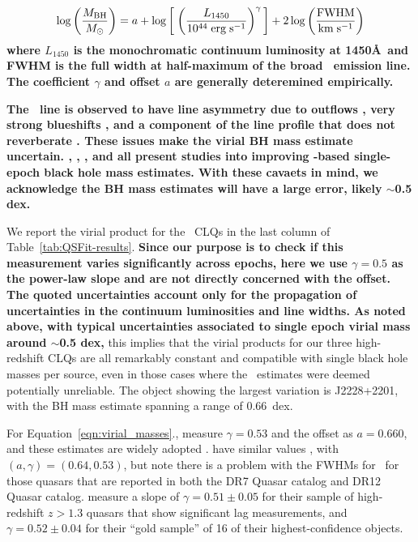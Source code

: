 \documentclass[fleqn,usenatbib]{mnras}
\begin{document}
{\bf
\begin{equation}
  \log \left( \frac{M_{\rm BH}}{M_{\odot}} \right)  = a + \log  \left[ \; \left(  \frac{L_{1450}} {10^{44} \; {\rm erg \; s^{-1}}}\right)^{\gamma} \, \right] + 2 \log \left( \frac{\rm {FWHM}}{{\rm km\; s^{-1}}} \right)
  \label{eqn:virial_masses}
\end{equation}
where $L_{1450}$ is the monochromatic continuum luminosity at 1450\AA\,
and FWHM is the full width at half-maximum of the broad \civ\ emission line.
The coefficient $\gamma$ and offset $a$ are generally deteremined empirically. 

 {\bf The \civ\ line is observed to have
line asymmetry due to outflows \citep[e.g.,][]{Gaskell1982}, very
strong blueshifts \citep[as mentioned in the Introduction, see
][]{Richards2011}, and a component of the line profile that does not
reverberate \citep[][]{Denney2012}.  These issues make the virial BH
mass estimate uncertain. \citet{Runnoe2013}, 
\citet{Mejia-Restrepo2016}, \citet{Coatman2017}, 
\citet{Mejia-Restrepo2018} and \citet{Grier2019} all present studies
into improving \civ-based single-epoch black hole mass estimates. With
these cavaets in mind, we acknowledge the BH mass estimates will have
a large error, likely $\sim$0.5 dex. }

We report the virial product for the \civ\ CLQs in the last column of
Table~\ref{tab:QSFit-results}.  {\bf Since our purpose is to check if
this measurement varies significantly across epochs, here we use
$\gamma=0.5$ as the power-law slope and are not directly concerned
with the offset.  The quoted uncertainties account only for the
propagation of uncertainties in the continuum luminosities and line
widths.  As noted above, with typical uncertainties associated to
single epoch virial mass around $\sim$0.5 dex,} this implies that the
virial products for our three high-redshift CLQs are all remarkably
constant and compatible with single black hole masses per source, even
in those cases where the \civ\ estimates were deemed potentially
unreliable. The object showing the largest variation is J2228+2201,
with the BH mass estimate spanning a range of 0.66~dex.

For Equation~\ref{eqn:virial_masses}., \citet{VestergaardPeterson2006}
measure $\gamma=0.53$ and the offset as $a=0.660$, and these estimates
are widely adopted \citep[e.g.,][]{Shen2011, Chen2019, Yao2019}.
\citet{Kozlowski2017} have similar values \citet{VestergaardPeterson2006} , with $(a,\gamma)=(0.64, 0.53)$,
but note there is a problem with the FWHMs for \civ\ for those quasars that are reported in
both the DR7 Quasar catalog and DR12 Quasar catalog.
\citet{Grier2019} measure a slope of $\gamma=0.51\pm0.05$ for their sample of high-redshift
$z>1.3$ quasars that show significant lag measurements,
and  $\gamma=0.52\pm0.04$ for their ``gold sample'' of 16 of
their highest-confidence objects. }
\end{document}
